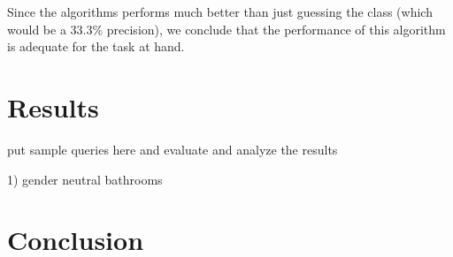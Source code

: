 Since the algorithms performs much better than just guessing the class (which would be a 33.3\% precision), we conclude that the performance of this algorithm is adequate for the task at hand.

\section{Results}
put sample queries here and evaluate and analyze the results

1) gender neutral bathrooms
 
\section{Conclusion}
\pagebreak




